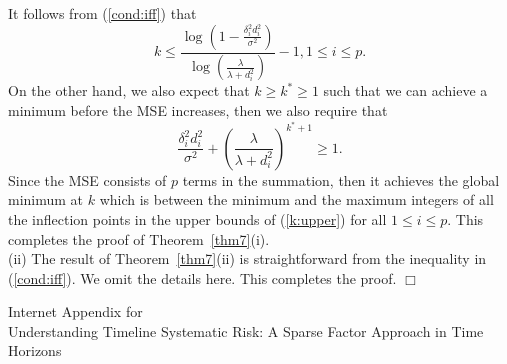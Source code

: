 {{It follows from (\ref{cond:iff}) that
\begin{equation}\label{k:upper}
    k\leq\frac{\log(1-\frac{\delta_i^2d_i^2}{\sigma^2})}{\log(\frac{\lambda}{\lambda+d_i^2})}-1, 1\leq i\leq p.
\end{equation}
On the other hand, we also expect that $k\geq k^*\geq 1$ such that we can achieve a minimum  before the MSE increases, then we also require that
\[\frac{\delta_i^2d_i^2}{\sigma^2}+(\frac{\lambda}{\lambda+d_i^2})^{k^*+1}\geq 1.\]
Since the MSE consists of $p$ terms in the summation, then it achieves the global minimum at $k$ which is between the minimum and the maximum integers of all the inflection points in the upper bounds of (\ref{k:upper}) for all $1\leq i\leq p$. This completes the proof of Theorem~\ref{thm7}(i).\\

(ii) The result of Theorem~\ref{thm7}(ii) is straightforward  from the inequality in (\ref{cond:iff}). We omit the details here. This completes the proof. $\Box$

	


	
	\begin{titlepage}
	
	\begin{center}
	{\Huge Internet Appendix for\\Understanding Timeline Systematic Risk: A Sparse Factor Approach in Time Horizons}
	\end{center}

	 \thispagestyle{empty}
		\vspace{0.5cm}
		
		\begin{abstract}
			The Internet Appendix collects the proofs and additional results that support the main text. 
			\vspace{1cm}
			
			\noindent\textbf{Keywords:} Factor Analysis, Principal Components, Sparsity, Large-Dimension, Panel Data	
			
			\noindent\textbf{JEL classification:} C14, C38, C55, G12
		\end{abstract}
	\end{titlepage}
	
	
	
	\setcounter{page}{1}
	
	\setcounter{section}{0}
	\setcounter{subsection}{0}
	
	\renewcommand{\thesection}{IA.\Alph{section}}
	\renewcommand{\thesubsection}{\thesection.\arabic{subsection}}
	
}}
